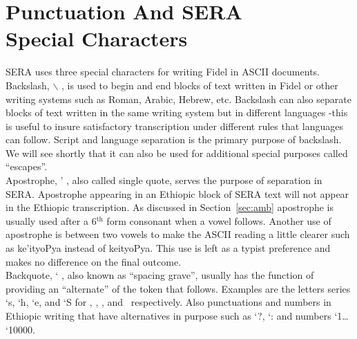 

\section[null]{Punctuation And SERA \\ Special Characters} 

SERA uses three special characters for writing Fidel in ASCII documents.
Backslash, $\backslash$ , is used to begin and end blocks of text written in 
Fidel or other
writing systems such as Roman, Arabic, Hebrew, etc.  Backslash can also separate
blocks of text written in the same writing system but in different languages
-this is useful to insure satisfactory transcription under different rules that
languages can follow.  Script and language separation is the primary purpose of
backslash.  We will see shortly that it can also be used for additional special
purposes called ``escapes''. \\

Apostrophe, ' , also called single quote, serves the purpose of separation in SERA.
Apostrophe appearing in an Ethiopic block of SERA text will not appear in the
Ethiopic transcription.  As discussed in Section~\ref{sec:amb} apostrophe is usually used 
after a 6$^{\textrm{th}}$ form consonant when a vowel follows. 
Another use
of apostrophe is between two vowels to make the ASCII reading a little clearer such as
ke'ityoPya instead of keityoPya.  This use is left as a typist preference and makes no
difference on the final outcome. \\

Backquote, ` , also known as ``spacing grave'', usually has the function of providing
an ``alternate'' of the token that follows.  Examples are the letters series `s, `h,
`e, and `S for \sse, \hhe, \ee, and \SSe \  respectively.  Also punctuations and numbers in
Ethiopic writing that have alternatives in purpose such as `?, `: and numbers `1\dots
`10000. \\

